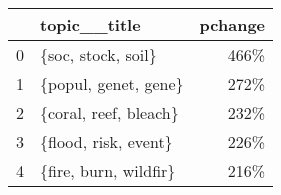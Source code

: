 \begin{tabular}{llr}
\toprule
{} &           topic\_\_title &  pchange \\
\midrule
0 &     \{soc, stock, soil\} &     466\% \\
1 &   \{popul, genet, gene\} &     272\% \\
2 &  \{coral, reef, bleach\} &     232\% \\
3 &   \{flood, risk, event\} &     226\% \\
4 &  \{fire, burn, wildfir\} &     216\% \\
\bottomrule
\end{tabular}
